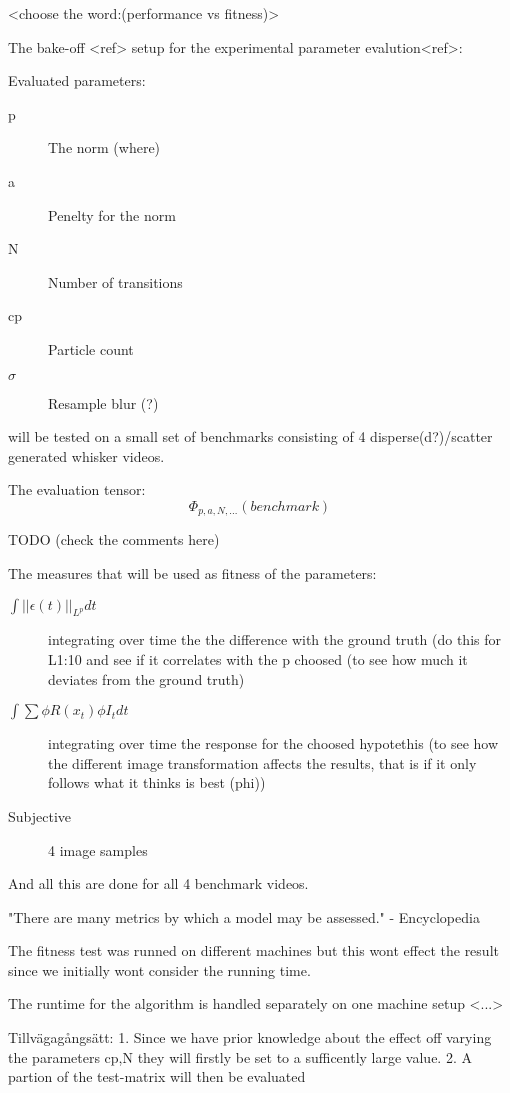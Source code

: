 
<choose the word:(performance vs fitness)>

The bake-off <ref> setup for the experimental parameter evalution<ref>:

Evaluated parameters:
\begin{description}
    \item[p] The norm (where)
    \item[a] Penelty for the norm
    \item[N] Number of transitions
    \item[cp] Particle count
    \item[$\sigma$] Resample blur (?)
\end{description}

will be tested on a small set of benchmarks consisting of 4 disperse(d?)/scatter generated whisker videos.

The evaluation tensor:
\begin{equation}
    \Phi_{p,a,N,...}(benchmark)
\end{equation}

TODO (check the comments here)

The measures that will be used as fitness of the parameters:
    \begin{description}
        \item[$\int{||\epsilon(t)||_{L^p}}dt$]
            integrating over time the the difference
            with the ground truth (do this for L{1:10} and see if it correlates with
            the p choosed (to see how much it deviates from the ground truth)
        \item[$\int{\sum{\phi{R(x_t)}\phi{I_t}} }dt$] 
            integrating over time the response
            for the choosed hypotethis (to see how the different image transformation
            affects the results, that is if it only follows what it thinks is best
            (phi))
        \item[Subjective] 4 image samples
    \end{description}
And all this are done for all 4 benchmark videos.


"There are many metrics by which a model may be assessed." - Encyclopedia


The fitness test was runned on different machines but this wont effect the
result since we initially wont consider the running time.

The runtime for the algorithm is handled separately on one machine setup <...>



Tillvägagångsätt:
1. Since we have prior knowledge about the effect off varying the parameters cp,N
they will firstly be set to a sufficently large value.
2. A partion of the test-matrix will then be evaluated 
